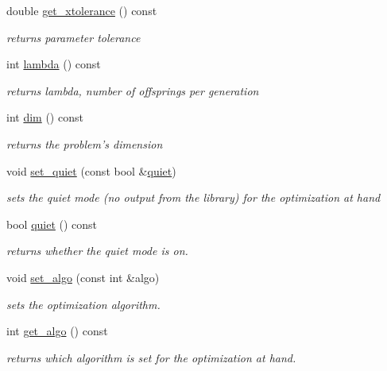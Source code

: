 \begin{DoxyCompactItemize}
double \hyperlink{classlibcmaes_1_1Parameters_a75b95a875008a0216038d43369cd9171}{get\-\_\-xtolerance} () const 
\begin{DoxyCompactList}\small\item\em returns parameter tolerance \end{DoxyCompactList}\item 
int \hyperlink{classlibcmaes_1_1Parameters_a3d569987e9a5eb61bc781ee75b2ab18a}{lambda} () const 
\begin{DoxyCompactList}\small\item\em returns lambda, number of offsprings per generation \end{DoxyCompactList}\item 
int \hyperlink{classlibcmaes_1_1Parameters_a95a3c04400a77d134bb1e9705189a24e}{dim} () const 
\begin{DoxyCompactList}\small\item\em returns the problem's dimension \end{DoxyCompactList}\item 
void \hyperlink{classlibcmaes_1_1Parameters_ae93cf5c15dbe42b19339b26b1c57f872}{set\-\_\-quiet} (const bool \&\hyperlink{classlibcmaes_1_1Parameters_a8562a739088f9f9f466b8d658084c9f7}{quiet})
\begin{DoxyCompactList}\small\item\em sets the quiet mode (no output from the library) for the optimization at hand \end{DoxyCompactList}\item 
bool \hyperlink{classlibcmaes_1_1Parameters_a8562a739088f9f9f466b8d658084c9f7}{quiet} () const 
\begin{DoxyCompactList}\small\item\em returns whether the quiet mode is on. \end{DoxyCompactList}\item 
void \hyperlink{classlibcmaes_1_1Parameters_aeb869d18fa0c987f56216d9bfa1f1a0d}{set\-\_\-algo} (const int \&algo)
\begin{DoxyCompactList}\small\item\em sets the optimization algorithm. \end{DoxyCompactList}\item 
int \hyperlink{classlibcmaes_1_1Parameters_a39697cd6cfb705a970223f8e95894545}{get\-\_\-algo} () const 
\begin{DoxyCompactList}\small\item\em returns which algorithm is set for the optimization at hand. \end{DoxyCompactList}\item 

\end{DoxyCompactItemize}
